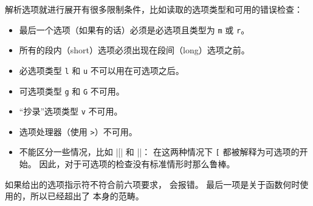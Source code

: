 \documentclass{l3doc}
\begin{document}
\begin{function}
%
解析选项就进行展开有很多限制条件，比如读取的选项类型和可用的错误检查：
\begin{itemize}
\item 最后一个选项（如果有的话）必须是必选项且类型为 \texttt{m} 或 \texttt{r}。
\item 所有的段内（short）选项必须出现在段间（long）选项之前。
\item 必选项类型 \texttt{l} 和 \texttt{u} 不可以用在可选项之后。
\item 可选项类型 \texttt{g} 和 \texttt{G} 不可用。
\item “抄录”选项类型 \texttt{v} 不可用。
\item 选项处理器（使用 \texttt{>}）不可用。
\item 不能区分一些情况，比如 |\foo[| 和 |\foo{[}|：
在这两种情况下 \texttt{[} 都被解释为可选项的开始。
因此，对于可选项的检查没有标准情形时那么鲁棒。
\end{itemize}
如果给出的选项指示符不符合前六项要求， 会报错。
最后一项是关于函数何时使用的，所以已经超出了  本身的范畴。
\end{function}
\end{document}
